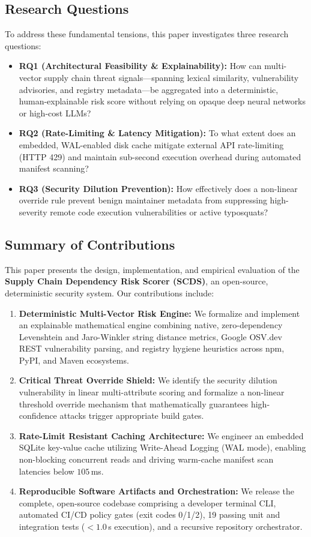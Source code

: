 \subsection{Research Questions}
To address these fundamental tensions, this paper investigates three research questions:
\begin{itemize}
    \item \textbf{RQ1 (Architectural Feasibility \& Explainability):} How can multi-vector supply chain threat signals---spanning lexical similarity, vulnerability advisories, and registry metadata---be aggregated into a deterministic, human-explainable risk score without relying on opaque deep neural networks or high-cost LLMs?
    \item \textbf{RQ2 (Rate-Limiting \& Latency Mitigation):} To what extent does an embedded, WAL-enabled disk cache mitigate external API rate-limiting (HTTP 429) and maintain sub-second execution overhead during automated manifest scanning?
    \item \textbf{RQ3 (Security Dilution Prevention):} How effectively does a non-linear override rule prevent benign maintainer metadata from suppressing high-severity remote code execution vulnerabilities or active typosquats?
\end{itemize}

\subsection{Summary of Contributions}
This paper presents the design, implementation, and empirical evaluation of the \textbf{Supply Chain Dependency Risk Scorer (SCDS)}, an open-source, deterministic security system. Our contributions include:
\begin{enumerate}
    \item \textbf{Deterministic Multi-Vector Risk Engine:} We formalize and implement an explainable mathematical engine combining native, zero-dependency Levenshtein and Jaro-Winkler string distance metrics, Google OSV.dev REST vulnerability parsing, and registry hygiene heuristics across npm, PyPI, and Maven ecosystems.
    \item \textbf{Critical Threat Override Shield:} We identify the security dilution vulnerability in linear multi-attribute scoring and formalize a non-linear threshold override mechanism that mathematically guarantees high-confidence attacks trigger appropriate build gates.
    \item \textbf{Rate-Limit Resistant Caching Architecture:} We engineer an embedded SQLite key-value cache utilizing Write-Ahead Logging (WAL mode), enabling non-blocking concurrent reads and driving warm-cache manifest scan latencies below $105$\,ms.
    \item \textbf{Reproducible Software Artifacts and Orchestration:} We release the complete, open-source codebase comprising a developer terminal CLI, automated CI/CD policy gates (exit codes 0/1/2), 19 passing unit and integration tests ($< 1.0$\,s execution), and a recursive repository orchestrator.
\end{enumerate}

